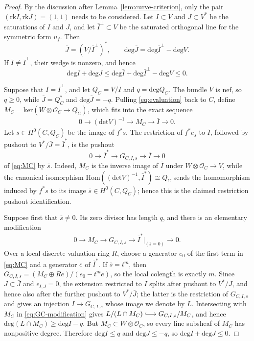 \documentclass[oneside,11pt]{amsart}
\theoremstyle{definition}
\theoremstyle{remark}
\numberwithin{thm}{section}
\numberwithin{equation}{section}
\begin{document}
\begin{proof}
By the discussion after Lemma~\ref{lem:curve-criterion}, only the pair $(\mathrm{rk}I,\mathrm{rk}J)=(1,1)$ needs to be
considered.  Let $\bar I\subset V$ and $\bar J\subset V^*$ be the
saturations of $I$ and $J$, and let $\bar I^\perp\subset V$ be the saturated orthogonal line for the symmetric form $u_f$.  Then
\[
 \bar J=(V/\bar I^\perp)^*,\qquad
 \mathrm{deg}\bar J=\mathrm{deg}\bar I^\perp-\mathrm{deg} V.
\]
If $\bar I\neq\bar I^\perp$, their wedge is nonzero, and hence
\[
 \mathrm{deg} I+\mathrm{deg} J
 \leq\mathrm{deg}\bar I+\mathrm{deg}\bar I^\perp-\mathrm{deg} V\leq0.
\]

Suppose that $\bar I=\bar I^\perp$, and let $Q_C=V/\bar I$ and
$q=\mathrm{deg}Q_C$.  The bundle $V$ is nef, so $q\geq0$, while
$\bar J=Q_C^*$ and $\mathrm{deg}\bar J=-q$.  Pulling \eqref{eq:evaluation} back to $C$, define $M_C=\mathrm{ker}(W\otimes\mathcal{O}_C\to Q_C)$, which fits into the exact
sequence
\begin{align}\label{eq:MC}
 0\longrightarrow(\mathrm{det} V)^{-1}\longrightarrow M_C
 \longrightarrow\bar I\longrightarrow0.
\end{align}
Let $\bar s\in H^0(C,Q_C)$ be the image of $f^*s$.  The restriction of $f^*e_s$ to $\bar I$, followed by pushout to
$V^*/\bar J=\bar I^*$, is the pushout
\[
 0\longrightarrow\bar I^*\longrightarrow G_{C,I,s}
 \longrightarrow\bar I\longrightarrow0
\]
of \eqref{eq:MC} by $\bar s$.
Indeed, $M_C$ is the inverse image of $\bar I$ under
$W\otimes\mathcal{O}_C\to V$, while the canonical isomorphism
$\mathrm{Hom}((\mathrm{det} V)^{-1},\bar I^*)\cong Q_C$ sends the
homomorphism induced by $f^*s$ to its image $\bar s\in H^0(C,Q_C)$; hence this is the claimed restriction pushout identification.

Suppose first that $\bar s\neq0$.  Its zero divisor has length $q$, and there is an elementary modification
\begin{align}\label{eq:GC-modification}
 0\longrightarrow M_C\longrightarrow G_{C,I,s}
 \longrightarrow\bar I^*|_{(\bar s=0)}\longrightarrow0.
\end{align}
Over a local discrete valuation ring $R$, choose a generator $e_0$ of the first term in \eqref{eq:MC} and a generator $e$ of $\bar I^*$.  If $\bar s=t^m$, then $G_{C,I,s}=(M_C\oplus Re)/(e_0-t^me)$, so the local colength is exactly $m$.  Since $J\subset\bar J$ and $\epsilon_{I,J}=0$, the extension restricted to $I$ splits after pushout to $V^*/J$, and hence also after the further pushout to $V^*/\bar J$; the latter is the restriction of $G_{C,I,s}$ and gives an injection $I\to G_{C,I,s}$ whose image we denote by $L$.  Intersecting with $M_C$ in \eqref{eq:GC-modification} gives $L/(L\cap M_C)\lhook\joinrel\longrightarrow G_{C,I,s}/M_C$, and hence
$\mathrm{deg}(L\cap M_C)\geq\mathrm{deg} I-q$. But $M_C\subset W\otimes\mathcal{O}_C$, so every line subsheaf of $M_C$
has nonpositive degree.  Therefore $\mathrm{deg} I\leq q$ and
$\mathrm{deg} J\leq-q$, so $\mathrm{deg} I+\mathrm{deg} J\leq0$.


\end{proof}
\end{document}
